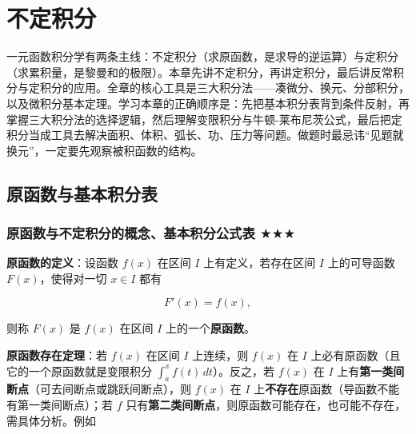 \documentclass[11pt,openany,UTF8]{ctexbook}
\begin{document}
\endgroup

\section{不定积分}

一元函数积分学有两条主线：不定积分（求原函数，是求导的逆运算）与定积分（求累积量，是黎曼和的极限）。本章先讲不定积分，再讲定积分，最后讲反常积分与定积分的应用。全章的核心工具是三大积分法——凑微分、换元、分部积分，以及微积分基本定理。学习本章的正确顺序是：先把基本积分表背到条件反射，再掌握三大积分法的选择逻辑，然后理解变限积分与牛顿-莱布尼茨公式，最后把定积分当成工具去解决面积、体积、弧长、功、压力等问题。做题时最忌讳“见题就换元”，一定要先观察被积函数的结构。

\subsection{原函数与基本积分表}

\subsubsection{原函数与不定积分的概念、基本积分公式表 $\bigstar$$\bigstar$$\bigstar$}

\textbf{原函数的定义}：设函数 $f(x)$ 在区间 $I$ 上有定义，若存在区间 $I$ 上的可导函数 $F(x)$，使得对一切 $x\in I$ 都有

\[F'(x)=f(x),\]

则称 $F(x)$ 是 $f(x)$ 在区间 $I$ 上的一个\textbf{原函数}。

\textbf{原函数存在定理}：若 $f(x)$ 在区间 $I$ 上连续，则 $f(x)$ 在 $I$ 上必有原函数（且它的一个原函数就是变限积分 $\int_a^x f(t)\,dt$）。反之，若 $f(x)$ 在 $I$ 上有\textbf{第一类间断点}（可去间断点或跳跃间断点），则 $f(x)$ 在 $I$ 上\textbf{不存在}原函数（导函数不能有第一类间断点）；若 $f$ 只有\textbf{第二类间断点}，则原函数可能存在，也可能不存在，需具体分析。例如
\end{document}
